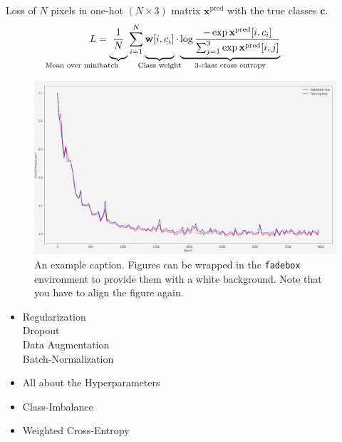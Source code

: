 \documentclass[
]{dtuposter}
\begin{document}
\begin{dtupostercontent}
Loss of \(N\) pixels in one-hot \((N \times  3)\) matrix \(\mathbf x^\text{pred}\) with the true classes \(\mathbf c\).
\[
L = \underbrace{
\vphantom{\sum_{i}}
\frac 1 N}
_{\mathllap{\text{Mean over minibatch}}}
\sum_{\mathclap {i=1}}^{N}
\underbrace{ 
\vphantom{\sum_{i}}
\mathbf{w}[i, c_i]}
_{\mathclap{\text{Class weight}}}  
\cdot 
\underbrace{
\log 
\frac
{-\exp\mathbf x^\text{pred}[i, c_i]}
{\sum_{j=1}^{3}\exp\mathbf x^\text{pred}[i, j]}
}_{\mathclap{\text{3-class cross entropy}}}
\]
\begin{figure}
	\begin{center}
			\includegraphics[width=\linewidth,origin=c]{loss2}
	\end{center}
	\caption{An example caption. Figures can be wrapped in the \texttt{fadebox} 
		environment to provide them with a white background. Note that you have to align the 
		figure again.}\label{fig:example2}
\end{figure}


\begin{itemize}
	\item Regularization \\
		Dropout \\
		Data Augmentation \\
		Batch-Normalization
	
	\item All about the Hyperparameters
\end{itemize}

\begin{itemize}
	\item Class-Imbalance
	\item Weighted Cross-Entropy
	

\end{itemize}
\end{dtupostercontent}
\end{document}
